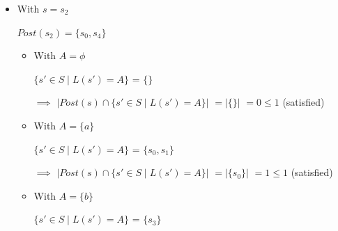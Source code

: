 \documentclass[a4paper,12pt]{article}
\begin{document}
\begin{itemize}
\begin{itemize}
\begin{itemize}
                $\{s' \in S \mid L(s') = A\}$ = $\{\}$

                $\implies$  $\left|Post(s) \cap \{s' \in S \mid L(s') = A\}\right|$ $= \left|\{\}\right|$ $= 0 \leq 1$ (satisfied)
                \item[-] With $A = \{a\}$
                
                $\{s' \in S \mid L(s') = A\}$ = $\{s_0, s_1\}$

                $\implies$ $\left|Post(s) \cap \{s' \in S \mid L(s') = A\}\right|$ $= \left|\{\}\right|$ $= 0 \leq 1$ (satisfied)
                \item[-] With $A = \{b\}$
            
                 $\{s' \in S \mid L(s') = A\}$ = $\{s_3\}$

                 $\implies$ $\left|Post(s) \cap \{s' \in S \mid L(s') = A\}\right|$ $= \left|\{s_3\}\right|$ $= 1 \leq 1$ (satisfied)
                \item[-] With $A = \{a, b\}$ 
                
                 $\{s' \in S \mid L(s') = A\}$ = $\{s_2, s_4\}$

                 $\implies$ $\left|Post(s) \cap \{s' \in S \mid L(s') = A\}\right|$ $= \left|\{s_4\}\right|$ $= 1 \leq 1$ (satisfied)
            \end{itemize}
        \item With $s = s_2$
           
            $Post(s_2) = \{s_0, s_4\}$

            \begin{itemize}
                \item[-] With $A = \phi$
                
                $\{s' \in S \mid L(s') = A\}$ = $\{\}$

                $\implies$  $\left|Post(s) \cap \{s' \in S \mid L(s') = A\}\right|$ $= \left|\{\}\right|$ $= 0 \leq 1$ (satisfied)
                \item[-] With $A = \{a\}$
                
                $\{s' \in S \mid L(s') = A\}$ = $\{s_0, s_1\}$

                $\implies$ $\left|Post(s) \cap \{s' \in S \mid L(s') = A\}\right|$ $= \left|\{s_0\}\right|$ $= 1 \leq 1$ (satisfied)
                \item[-] With $A = \{b\}$
            
                 $\{s' \in S \mid L(s') = A\}$ = $\{s_3\}$


\end{itemize}
\end{itemize}
\end{itemize}
\end{document}
